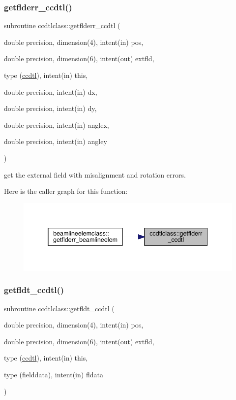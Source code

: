 \subsubsection{\texorpdfstring{getflderr\_ccdtl()}{getflderr\_ccdtl()}}
{\footnotesize\ttfamily subroutine ccdtlclass\+::getflderr\+\_\+ccdtl (\begin{DoxyParamCaption}\item[{double precision, dimension(4), intent(in)}]{pos,  }\item[{double precision, dimension(6), intent(out)}]{extfld,  }\item[{type (\mbox{\hyperlink{namespaceccdtlclass_structccdtlclass_1_1ccdtl}{ccdtl}}), intent(in)}]{this,  }\item[{double precision, intent(in)}]{dx,  }\item[{double precision, intent(in)}]{dy,  }\item[{double precision, intent(in)}]{anglex,  }\item[{double precision, intent(in)}]{angley }\end{DoxyParamCaption})}



get the external field with misalignment and rotation errors. 

Here is the caller graph for this function\+:\nopagebreak
\begin{figure}[H]
\begin{center}
\leavevmode
\includegraphics[width=338pt]{namespaceccdtlclass_ab81d1b262943e405eebe3bfef401bb97_icgraph}
\end{center}
\end{figure}
\mbox{\label{namespaceccdtlclass_aa1b97607af3b788522be9e22c479ce2a}} 
\subsubsection{\texorpdfstring{getfldt\_ccdtl()}{getfldt\_ccdtl()}}
{\footnotesize\ttfamily subroutine ccdtlclass\+::getfldt\+\_\+ccdtl (\begin{DoxyParamCaption}\item[{double precision, dimension(4), intent(in)}]{pos,  }\item[{double precision, dimension(6), intent(out)}]{extfld,  }\item[{type (\mbox{\hyperlink{namespaceccdtlclass_structccdtlclass_1_1ccdtl}{ccdtl}}), intent(in)}]{this,  }\item[{type (fielddata), intent(in)}]{fldata }\end{DoxyParamCaption})}



